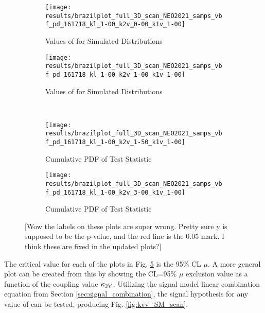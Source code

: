     \begin{figure}
        \centering
        \begin{subfigure}{0.48\textwidth} 
            \texttt{[image: results/brazilplot\_full\_3D\_scan\_NEO2021\_samps\_vbf\_pd\_161718\_kl\_1-00\_k2v\_0-00\_k1v\_1-00]}
            \caption{Values of \qtil for Simulated Distributions}
            \label{fig:mu_CL_k2v0}
        \end{subfigure}
        \begin{subfigure}{0.48\textwidth} 
            \texttt{[image: results/brazilplot\_full\_3D\_scan\_NEO2021\_samps\_vbf\_pd\_161718\_kl\_1-00\_k2v\_1-00\_k1v\_1-00]}
            \caption{Values of \qtil for Simulated Distributions}
            \label{fig:mu_CL_k2v1}
        \end{subfigure} \\
        \begin{subfigure}{0.48\textwidth}
            \texttt{[image: results/brazilplot\_full\_3D\_scan\_NEO2021\_samps\_vbf\_pd\_161718\_kl\_1-00\_k2v\_1-50\_k1v\_1-00]}
            \caption{Cumulative PDF of \qtil Test Statistic}
            \label{fig:mu_CL_k2v1.5}
        \end{subfigure}
        \begin{subfigure}{0.48\textwidth}
            \texttt{[image: results/brazilplot\_full\_3D\_scan\_NEO2021\_samps\_vbf\_pd\_161718\_kl\_1-00\_k2v\_3-00\_k1v\_1-00]}
            \caption{Cumulative PDF of \qtil Test Statistic}
            \label{fig:mu_CL_k2v3}
        \end{subfigure}
        \caption{
            [Wow the labels on these plots are super wrong. Pretty sure y is supposed to be the p-value,
                and the red line is the 0.05 mark. I think these are fixed in the updated plots?]
        }\label{fig:mu_CL_vals}
    \end{figure}

    \FloatBarrier
    The critical value for each of the plots in Fig. \ref{fig:mu_CL_vals} is the 95\% CL $\mu$.
    A more general plot can be created from this by showing the CL=95\% $\mu$
        exclusion value as a function of the coupling value $\kappa_{2V}$.
    Utilizing the signal model linear combination equation from Section \ref{sec:signal_combination},
        the signal hypothesis for any value of \kvv can be tested, producing Fig. \ref{fig:kvv_SM_scan}.

